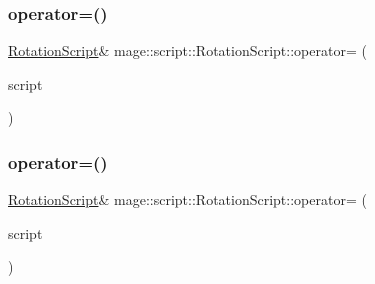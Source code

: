 \hypertarget{classmage_1_1script_1_1_rotation_script_afa4e9fcddf4f20f6c471dfd5fed1610f}{}\label{classmage_1_1script_1_1_rotation_script_afa4e9fcddf4f20f6c471dfd5fed1610f} 
\subsubsection{\texorpdfstring{operator=()}{operator=()}\hspace{0.1cm}{\footnotesize\ttfamily [1/2]}}
{\footnotesize\ttfamily \hyperlink{classmage_1_1script_1_1_rotation_script}{Rotation\+Script}\& mage\+::script\+::\+Rotation\+Script\+::operator= (\begin{DoxyParamCaption}\item[{const \hyperlink{classmage_1_1script_1_1_rotation_script}{Rotation\+Script} \&}]{script }\end{DoxyParamCaption})\hspace{0.3cm}{\ttfamily [delete]}}

\hypertarget{classmage_1_1script_1_1_rotation_script_a72642ac8b1f210ab4eb7feb67238a1bb}{}\label{classmage_1_1script_1_1_rotation_script_a72642ac8b1f210ab4eb7feb67238a1bb} 
\subsubsection{\texorpdfstring{operator=()}{operator=()}\hspace{0.1cm}{\footnotesize\ttfamily [2/2]}}
{\footnotesize\ttfamily \hyperlink{classmage_1_1script_1_1_rotation_script}{Rotation\+Script}\& mage\+::script\+::\+Rotation\+Script\+::operator= (\begin{DoxyParamCaption}\item[{\hyperlink{classmage_1_1script_1_1_rotation_script}{Rotation\+Script} \&\&}]{script }\end{DoxyParamCaption})\hspace{0.3cm}{\ttfamily [delete]}}

\hypertarget{classmage_1_1script_1_1_rotation_script_aa4b49dc5e34da3e851d5aefc4c4a434b}{}\label{classmage_1_1script_1_1_rotation_script_aa4b49dc5e34da3e851d5aefc4c4a434b} 
